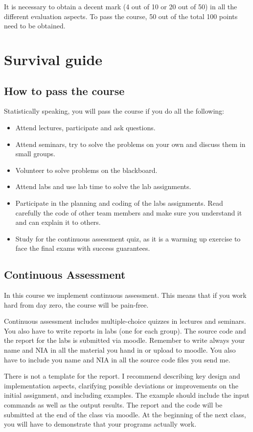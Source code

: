 It is necessary to obtain a decent mark (4 out of 10 or 20 out of 50) in all the different evaluation aspects.
To pass the course, 50 out of the total 100 points need to be obtained.

\section{Survival guide}

\subsection{How to pass the course}

Statistically speaking, you will pass the course if you do all the following:
\begin{itemize}
\item Attend lectures, participate and ask questions.
\item Attend seminars, try to solve the problems on your own and discuss them in small groups.
\item Volunteer to solve problems on the blackboard.
\item Attend labs and use lab time to solve the lab assignments.
\item Participate in the planning and coding of the labs assignments. Read carefully the code of other team members and make sure you understand it and can explain it to others.
\item Study for the continuous assessment quiz, as it is a warming up exercise to face the final exams with success guarantees.
\end{itemize}

\subsection{Continuous Assessment}
In this course we implement continuous assessment.
This means that if you work hard from day zero, the course will be pain-free.

Continuous assessment includes multiple-choice quizzes in lectures and seminars.
You also have to write reports in labs (one for each group).
The source code and the report for the labs is submitted via moodle.
Remember to write always your name and NIA in all the material you hand in or upload to moodle. 
You also have to include you name and NIA in all the source code files you send me.

There is not a template for the report.
I recommend describing key design and implementation aspects, clarifying possible deviations or improvements on the initial assignment, and including examples.
The example should include the input commands as well as the output results.
The report and the code will be submitted at the end of the class via moodle.
At the beginning of the next class, you will have to demonstrate that your programs actually work.


